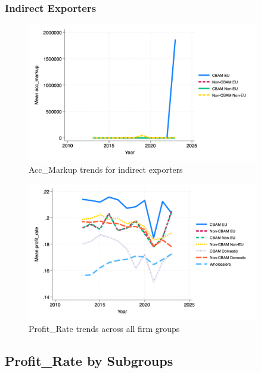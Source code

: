 \documentclass{article}
\begin{document}
\subsubsection{Indirect Exporters}
\begin{figure}[h!]
\centering
\includegraphics[width=0.9\textwidth]{acc_markup_indir.png}
\caption{Acc_Markup trends for indirect exporters}
\label{fig:acc_markup_indir}
\end{figure}

\begin{figure}[h!]
\centering
\includegraphics[width=0.9\textwidth]{profit_rate_main_groups.png}
\caption{Profit_Rate trends across all firm groups}
\label{fig:profit_rate_main}
\end{figure}

\subsection{Profit_Rate by Subgroups}
\end{document}
